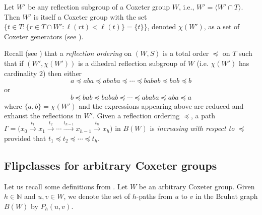 \documentclass[12pt,reqno]{amsart}
\theoremstyle{plain}
\theoremstyle{definition}
\theoremstyle{remark}
\begin{document}
Let $W'$ be any reflection subgroup of a Coxeter group $W$, i.e., $W'= \langle W' \cap T\rangle$. Then $W'$ is itself a Coxeter group with the set $\{ t \in T : \{r\in T \cap W' : \ell(rt)<\ell(t) \}=\{t\}  \}$, denoted $\chi(W')$, as a set of Coxeter generators  (see \cite{DyeJAlg}). 

Recall (see \cite[\S 2]{DyeComp}) that a {\em reflection ordering} on $(W,S)$ is a total order $\preceq$ on $T$ such that if $(W',\chi(W'))$
is a dihedral reflection subgroup of $W$ (i.e. $\chi(W')$
has cardinality $2$) then either
\[
a \preceq aba \preceq ababa 	\preceq \cdots \preceq babab \preceq bab \preceq b
\]
or 
\[
b \preceq bab \preceq babab \preceq \cdots \preceq ababa \preceq aba \preceq a
\]
where $\{ a,b \}= \chi(W')$ and the expressions appearing above are reduced and exhaust the reflections in $W'$. 
Given a reflection ordering $\preceq $,  a  path $\Gamma= \big(x_0 \stackrel{t_1}{\longrightarrow} x_1 \stackrel{t_2}{\longrightarrow}  \cdots \stackrel{t_{h-1}}{\longrightarrow} x_{h-1}\stackrel{t_h}{\longrightarrow} x_h\big)$ in $B(W)$ is \emph{increasing with respect to $\preceq $} provided that $t_1 \preceq t_2\preceq \cdots \preceq t_h$.




\subsection{Flipclasses for arbitrary Coxeter groups}
Let us recall some definitions from \cite{EMS}. 
Let $W$ be an  arbitrary Coxeter group.  
Given $h \in \mathbb N$ and $u,v \in  W$, we denote the set of $h$-paths from $u$ to $v$ in the Bruhat graph $B(W)$ by $P_{h}(u,v)$. 
\end{document}
